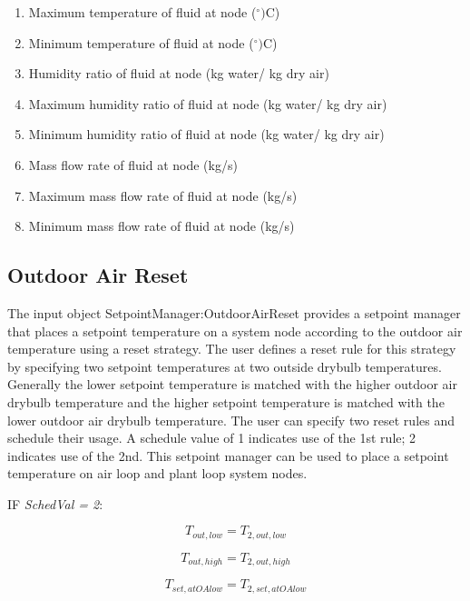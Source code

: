 \begin{enumerate}
\item Maximum temperature of fluid at node (\(^{\circ})\)C)
\item Minimum temperature of fluid at node (\(^{\circ})\)C)
\item Humidity ratio of fluid at node (kg water/ kg dry air)
\item Maximum humidity ratio of fluid at node (kg water/ kg dry air)
\item Minimum humidity ratio of fluid at node (kg water/ kg dry air)
\item Mass flow rate of fluid at node (kg/s)
\item Maximum mass flow rate of fluid at node (kg/s)
\item Minimum mass flow rate of fluid at node (kg/s)
\end{enumerate}

\subsection{Outdoor Air Reset}\label{outdoor-air-reset}

The input object SetpointManager:OutdoorAirReset provides a setpoint manager that places a setpoint temperature on a system node according to the outdoor air temperature using a reset strategy. The user defines a reset rule for this strategy by specifying two setpoint temperatures at two outside drybulb temperatures. Generally the lower setpoint temperature is matched with the higher outdoor air drybulb temperature and the higher setpoint temperature is matched with the lower outdoor air drybulb temperature. The user can specify two reset rules and schedule their usage. A schedule value of 1 indicates use of the 1st rule; 2 indicates use of the 2nd. This setpoint manager can be used to place a setpoint temperature on air loop and plant loop system nodes.

IF \emph{SchedVal = 2}:

\begin{equation}
{T_{out,low}} = {T_{2,out,low}}
\end{equation}

\begin{equation}
{T_{out,high}} = {T_{2,out,high}}
\end{equation}

\begin{equation}
{T_{set,atOAlow}} = {T_{2,set,atOAlow}}
\end{equation}

